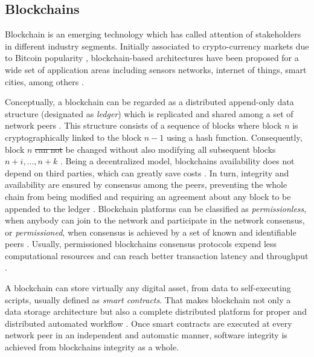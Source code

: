 \documentclass[journal]{IEEEtran}
\providecommand{\DIFadd}[1]{{\protect\color{blue}\uwave{#1}}} %
\providecommand{\DIFdel}[1]{{\protect\color{red}\sout{#1}}}                      %
\providecommand{\DIFaddbegin}{} %
\providecommand{\DIFaddend}{} %
\providecommand{\DIFdelbegin}{} %
\providecommand{\DIFdelend}{} %
\begin{document}
\subsection{Blockchains}
Blockchain is an emerging technology which has called attention of stakeholders in different industry segments. 
Initially associated to crypto-currency markets due to Bitcoin popularity \cite{Zheng2017}, blockchain-based architectures have been proposed for a wide set of application areas including sensors networks, internet of things, smart cities, among others \cite{Zheng2017,Christidis2016}. 

Conceptually, a blockchain can be regarded as a distributed append-only data structure (designated as \emph{ledger}) which is replicated and shared among a set of network peers \cite{Christidis2016}. 
This structure consists of a sequence of blocks where block $n$ is cryptographically linked to the block $n-1$ using a hash function.
Consequently, block $n$ \DIFdelbegin \DIFdel{can not }\DIFdelend \DIFaddbegin \DIFadd{cannot }\DIFaddend be changed without also modifying all subsequent blocks $n + i, ..., n + k$ \cite{Sousa2018}. 
Being a decentralized model, blockchains availability does not depend on third parties, which can greatly save costs \cite{Zheng2017}.
In turn, integrity and availability are ensured by consensus among the peers, preventing the whole chain from being modified and requiring an agreement about any block to be appended to the ledger \cite{Sousa2018,Vukolic2016}.
Blockchain platforms can be classified as \emph{permissionless}, when anybody can join to the network and participate in the network consensus, or \emph{permissioned}, when consensus is achieved by a set of known and identifiable peers \cite{Vukolic2016}. Usually, permissioned blockchains consensus protocols expend less computational resources and can reach better transaction latency and throughput \cite{Sousa2018}.

A blockchain can store virtually any digital asset, from data to self-executing scripts, usually defined as \emph{smart contracts}. %
That makes blockchain not only a data storage architecture but also a complete distributed platform for proper and distributed automated workflow \cite{Christidis2016}. 
Once smart contracts are executed at every network peer in an independent and automatic manner, software integrity is achieved from blockchains integrity as a whole. 
\end{document}
